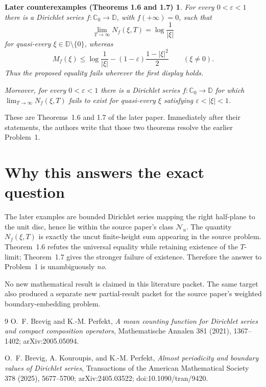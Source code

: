 \documentclass[11pt]{article}
\newtheorem*{laterthm}{Later counterexamples (Theorems 1.6 and 1.7)}
\begin{document}
\begin{laterthm}
For every $0<\varepsilon<1$ there is a Dirichlet series
$f:\mathbb C_0\to\mathbb D$, with $f(+\infty)=0$, such that
\[
 \lim_{T\to\infty}N_f(\xi,T)=\log\frac1{|\xi|}
\]
for quasi-every $\xi\in\mathbb D\setminus\{0\}$, whereas
\[
 M_f(\xi)\leq \log\frac1{|\xi|}
 -(1-\varepsilon)\frac{1-|\xi|^2}{2}
 \qquad(\xi\ne0).
\]
Thus the proposed equality fails wherever the first display holds.

Moreover, for every $0<\varepsilon<1$ there is a Dirichlet series
$f:\mathbb C_0\to\mathbb D$ for which
$\lim_{T\to\infty}N_f(\xi,T)$ fails to exist for quasi-every $\xi$ satisfying
$\varepsilon<|\xi|<1$.
\end{laterthm}

These are Theorems~1.6 and 1.7 of the later paper.  Immediately after their
statements, the authors write that those two theorems resolve the earlier
Problem~1.

\section{Why this answers the exact question}

The later examples are bounded Dirichlet series mapping the right half-plane
to the unit disc, hence lie within the source paper's class $\mathcal N_u$.
The quantity $N_f(\xi,T)$ is exactly the uncut finite-height sum appearing in
the source problem.  Theorem~1.6 refutes the universal equality while retaining
existence of the $T$-limit; Theorem~1.7 gives the stronger failure of existence.
Therefore the answer to Problem~1 is unambiguously \emph{no}.

No new mathematical result is claimed in this literature packet.  The same
target also produced a separate new partial-result packet for the source
paper's weighted boundary-embedding problem.

\begin{thebibliography}{9}
O.~F. Brevig and K.-M. Perfekt,
\emph{A mean counting function for Dirichlet series and compact composition
operators}, Mathematische Annalen 381 (2021), 1367--1402;
arXiv:2005.05094.

O.~F. Brevig, A. Kouroupis, and K.-M. Perfekt,
\emph{Almost periodicity and boundary values of Dirichlet series},
Transactions of the American Mathematical Society 378 (2025), 5677--5700;
arXiv:2405.03522; doi:10.1090/tran/9420.
\end{thebibliography}
\end{document}
